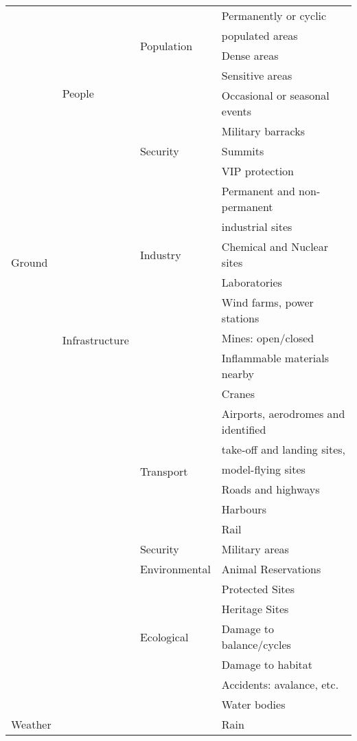 \documentclass{ua_wgs_base}
\begin{document}
\begin{centering}
\begin{longtable}{|l|l|l|l|}
 \multirow{21}{3em}{Ground} & \multirow{8}{7em}{People}  & \multirow{4}{5em}{Population} & Permanently or cyclic \\
  & & & populated areas \\\cline{4-4}
  & & & Dense areas \\\cline{4-4}
  & & & Sensitive areas \\\cline{4-4}
  & & & Occasional or seasonal events \\\cline{3-4}
  & & \multirow{3}{5em}{Security} & Military barracks \\
  & & & Summits \\
  & & & VIP protection \\\cline{2-4}
  & \multirow{12}{5em}{Infrastructure} & \multirow{5}{3em}{Industry} & Permanent and non-permanent \\
  & & & industrial sites \\\cline{4-4}
  & & & Chemical and Nuclear sites \\\cline{4-4}
  & & & Laboratories \\\cline{4-4}
  & & & Wind farms, power stations \\\cline{4-4}
  & & & Mines: open/closed \\
  & & & Inflammable materials nearby \\
  & & & Cranes \\\cline{3-4}
  & & \multirow{6}{5em}{Transport} & Airports, aerodromes and identified \\
  & & & take-off and landing sites, \\
  & & & model-flying sites \\\cline{4-4}
  & & & Roads and highways \\\cline{4-4}
  & & & Harbours \\\cline{4-4}
  & & & Rail \\\cline{3-4}
  & & Security & Military areas \\\cline{3-4}
  & & Environmental & Animal Reservations \\\cline{4-4}
  & & & Protected Sites \\\cline{4-4}
  & & & Heritage Sites \\\cline{3-4}
  & & Ecological & Damage to balance/cycles \\\cline{4-4}
  & & & Damage to habitat \\\cline{4-4}
  & & & Accidents: avalance, etc. \\\cline{4-4}
  & & & Water bodies \\\cline{1-4}
 \multirow{5}{3em}{Weather} & & & Rain \\\cline{4-4}

\end{longtable}
\end{centering}
\end{document}
